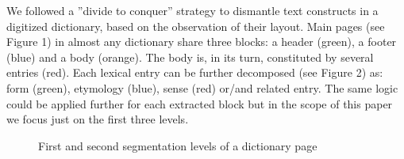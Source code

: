 \documentclass[twocolumn,a4paper]{article}
\begin{document}
 We followed a ”divide to conquer” strategy to dismantle text constructs in a digitized dictionary, based on the observation of their layout. Main pages (see Figure 1) in almost any dictionary share three blocks: a header (green), a footer (blue) and a body (orange). 
The body is, in its turn, constituted by several entries (red). Each lexical entry can be further decomposed (see Figure 2) as: form (green), etymology (blue), sense (red) or/and related entry. The same logic could be applied further for each extracted block but in the scope of this paper we focus just on the first three levels.
 \begin{figure}
\caption{First and second segmentation levels of a dictionary page~\cite{larousse1975france}\label{fig:mouseover}}
\end{figure}
\end{document}
